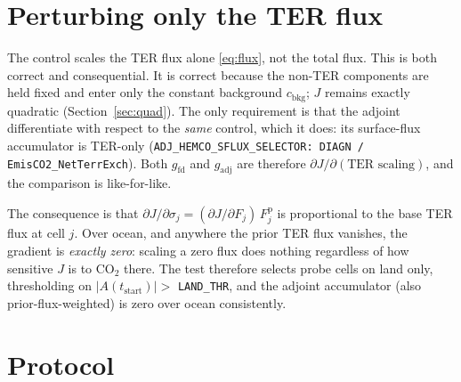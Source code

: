 \documentclass[12pt]{article}
\newcommand{\Fprior}{F^{\mathrm{p}}}
\newcommand{\tstart}{t_{\mathrm{start}}}
\newcommand{\Adj}{A}
\newcommand{\gfit}{g_{\mathrm{fd}}}
\newcommand{\gadj}{g_{\mathrm{adj}}}
\begin{document}
\section{Perturbing only the TER flux}

The control scales the TER flux alone \eqref{eq:flux}, not the total flux. This is
both correct and consequential. It is correct because the non-TER components are
held fixed and enter only the constant background $c_{\mathrm{bkg}}$; $J$ remains
exactly quadratic (Section~\ref{sec:quad}). The only requirement is that the
adjoint differentiate with respect to the \emph{same} control, which it does: its
surface-flux accumulator is TER-only
(\texttt{ADJ\_HEMCO\_SFLUX\_SELECTOR: DIAGN / EmisCO2\_NetTerrExch}). Both $\gfit$
and $\gadj$ are therefore $\partial J/\partial(\text{TER scaling})$, and the
comparison is like-for-like.

The consequence is that
$\partial J/\partial\sigma_j = (\partial J/\partial F_j)\,\Fprior_j$ is
proportional to the base TER flux at cell $j$. Over ocean, and anywhere the prior
TER flux vanishes, the gradient is \emph{exactly zero}: scaling a zero flux does
nothing regardless of how sensitive $J$ is to CO$_2$ there. The test therefore
selects probe cells on land only, thresholding on $|\Adj(\tstart)| >$
\texttt{LAND\_THR}, and the adjoint accumulator (also prior-flux-weighted) is zero
over ocean consistently.

\section{Protocol}
\end{document}
